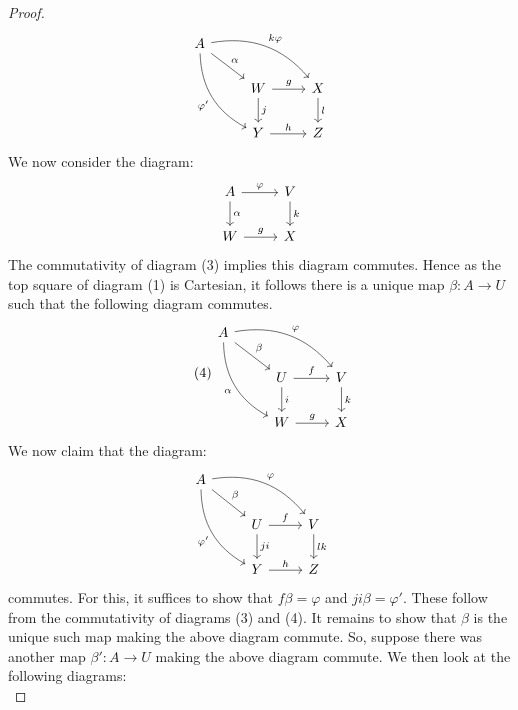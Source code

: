 \documentclass{amsart}
\begin{document}
\begin{proof}
\begin{equation}
\begin{tikzcd}
            A \arrow[drr, "k\varphi", bend left] \arrow[rdd, "\varphi'"', bend right] \arrow[rd, "\alpha"] & &  \\
            & W \arrow[r, "g"] \arrow[d, "j"] & X \arrow[d, "l"] \\
            & Y \arrow[r, "h"] & Z
        \end{tikzcd}
    \end{equation}
    We now consider the diagram:
    \begin{equation*}
        \begin{tikzcd}
            A \arrow[r, "\varphi"] \arrow[d, "\alpha"] & V \arrow[d, "k"] \\
            W \arrow[r, "g"] & X
        \end{tikzcd}
    \end{equation*}
    The commutativity of diagram (3) implies this diagram commutes. Hence as the top square of diagram (1) is Cartesian, it follows there is a unique map $\beta:A\rightarrow U$ such that the following diagram commutes.
    \begin{equation} \tag{4}
        \begin{tikzcd}
            A \arrow[drr, "\varphi", bend left] \arrow[rdd, "\alpha"', bend right] \arrow[rd, "\beta"] & &  \\
            & U \arrow[r, "f"] \arrow[d, "i"] & V \arrow[d, "k"] \\
            & W \arrow[r, "g"] & X
        \end{tikzcd}
    \end{equation}
    We now claim that the diagram:
    \begin{equation*}
        \begin{tikzcd}
            A \arrow[drr, "\varphi", bend left] \arrow[rdd, "\varphi'"', bend right] \arrow[rd, "\beta"] & &  \\
            & U \arrow[r, "f"] \arrow[d, "ji"] & V \arrow[d, "lk"] \\
            & Y \arrow[r, "h"] & Z
        \end{tikzcd}
    \end{equation*}
    commutes. For this, it suffices to show that $f\beta=\varphi$ and $ji\beta=\varphi'$. These follow from the commutativity of diagrams (3) and (4). It remains to show that $\beta$ is the unique such map making the above diagram commute. So, suppose there was another map $\beta':A\rightarrow U$ making the above diagram commute. We then look at the following diagrams:
    \begin{equation*}

\end{equation*}
\end{proof}
\end{document}
